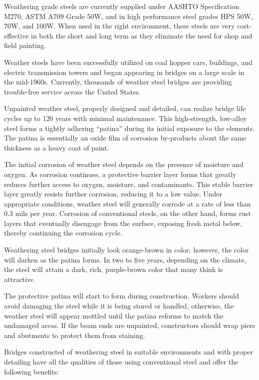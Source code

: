 Weathering grade steels are currently supplied under AASHTO Specification M270, ASTM A709 Grade 50W,
and in high performance steel grades HPS 50W, 70W, and 100W. When used in the right environment, these steels
are very cost-effective in both the short and long term as they eliminate the need for shop and field painting.

Weather steels have been successfully utilized on coal hopper cars, buildings, and electric transmission towers
and began appearing in bridges on a large scale in the mid-1960s. Currently, thousands of weather steel bridges are
providing trouble-free service across the United States.

Unpainted weather steel, properly designed and detailed, can realize bridge life cycles up to 120 years with
minimal maintenance. This high-strength, low-alloy steel forms a tightly adhering “patina” during its initial
exposure to the elements. The patina is essentially an oxide film of corrosion by-products about the same thickness
as a heavy coat of paint.

The initial corrosion of weather steel depends on the presence of moisture and oxygen. As corrosion continues, a
protective barrier layer forms that greatly reduces further access to oxygen, moisture, and contaminants. This stable
barrier layer greatly resists further corrosion, reducing it to a low value. Under appropriate conditions, weather steel
will generally corrode at a rate of less than 0.3 mils per year. Corrosion of conventional steels, on the other hand,
forms rust layers that eventually disengage from the surface, exposing fresh metal below, thereby continuing the
corrosion cycle.

Weathering steel bridges initially look orange-brown in color; however, the color will darken as the patina forms.
In two to five years, depending on the climate, the steel will attain a dark, rich, purple-brown color that many think is
attractive.

The protective patina will start to form during construction. Workers should avoid damaging the steel while it is
being stored or handled, otherwise, the weather steel will appear mottled until the patina reforms to match the
undamaged areas. If the beam ends are unpainted, constructors should wrap piers and abutments to protect them
from staining.

Bridges constructed of weathering steel in suitable environments and with proper detailing have all the qualities
of those using conventional steel and offer the following benefits:

